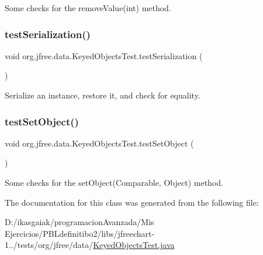 Some checks for the remove\+Value(int) method. \mbox{\label{classorg_1_1jfree_1_1data_1_1_keyed_objects_test_ad3e916d4fb1973539cfd7c7465f9a4ce}} 
\subsubsection{\texorpdfstring{test\+Serialization()}{testSerialization()}}
{\footnotesize\ttfamily void org.\+jfree.\+data.\+Keyed\+Objects\+Test.\+test\+Serialization (\begin{DoxyParamCaption}{ }\end{DoxyParamCaption})}

Serialize an instance, restore it, and check for equality. \mbox{\label{classorg_1_1jfree_1_1data_1_1_keyed_objects_test_a68c06178d00ed17cc2365af796bea490}} 
\subsubsection{\texorpdfstring{test\+Set\+Object()}{testSetObject()}}
{\footnotesize\ttfamily void org.\+jfree.\+data.\+Keyed\+Objects\+Test.\+test\+Set\+Object (\begin{DoxyParamCaption}{ }\end{DoxyParamCaption})}

Some checks for the set\+Object(\+Comparable, Object) method. 

The documentation for this class was generated from the following file\+:\begin{DoxyCompactItemize}
\item 
D\+:/ikasgaiak/programacion\+Avanzada/\+Mis Ejercicios/\+P\+B\+Ldefinitibo2/libs/jfreechart-\/1../tests/org/jfree/data/\mbox{\hyperlink{_keyed_objects_test_8java}{Keyed\+Objects\+Test.\+java}}\end{DoxyCompactItemize}
